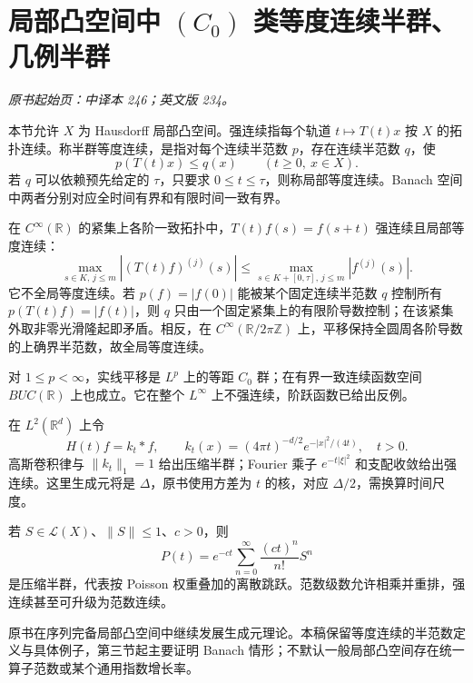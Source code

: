 \section{局部凸空间中 \texorpdfstring{$(C_0)$}{(C0)} 类等度连续半群、几例半群}\label{sec:yosida-09-02}
\noindent\textit{原书起始页：中译本 246；英文版 234。}

本节允许 $X$ 为 Hausdorff 局部凸空间。强连续指每个轨道 $t\mapsto T(t)x$ 按 $X$ 的拓扑连续。称半群等度连续，是指对每个连续半范数 $p$，存在连续半范数 $q$，使
\begin{equation}\label{eq:y9-equicontinuity}
 p(T(t)x)\le q(x)\qquad(t\ge0,\ x\in X).
\end{equation}
若 $q$ 可以依赖预先给定的 $\tau$，只要求 $0\le t\le\tau$，则称局部等度连续。Banach 空间中两者分别对应全时间有界和有限时间一致有界。

\begin{example}[局部与全局等度连续]
在 $C^\infty(\mathbb R)$ 的紧集上各阶一致拓扑中，$T(t)f(s)=f(s+t)$ 强连续且局部等度连续：
\[
 \max_{s\in K,\,j\le m}|(T(t)f)^{(j)}(s)|
 \le\max_{s\in K+[0,\tau],\,j\le m}|f^{(j)}(s)|.
\]
它不全局等度连续。若 $p(f)=|f(0)|$ 能被某个固定连续半范数 $q$ 控制所有 $p(T(t)f)=|f(t)|$，则 $q$ 只由一个固定紧集上的有限阶导数控制；在该紧集外取非零光滑隆起即矛盾。相反，在 $C^\infty(\mathbb R/2\pi\mathbb Z)$ 上，平移保持全圆周各阶导数的上确界半范数，故全局等度连续。
\end{example}

\begin{example}[平移、热流与跳跃]
对 $1\le p<\infty$，实线平移是 $L^p$ 上的等距 $C_0$ 群；在有界一致连续函数空间 $BUC(\mathbb R)$ 上也成立。它在整个 $L^\infty$ 上不强连续，阶跃函数已给出反例。

在 $L^2(\mathbb R^d)$ 上令
\begin{equation}\label{eq:y9-heat}
 H(t)f=k_t*f,\qquad k_t(x)=(4\pi t)^{-d/2}e^{-|x|^2/(4t)},\quad t>0.
\end{equation}
高斯卷积律与 $\|k_t\|_1=1$ 给出压缩半群；Fourier 乘子 $e^{-t|\xi|^2}$ 和支配收敛给出强连续。这里生成元将是 $\Delta$，原书使用方差为 $t$ 的核，对应 $\Delta/2$，需换算时间尺度。

若 $S\in\mathcal L(X)$、$\|S\|\le1$、$c>0$，则
\[
 P(t)=e^{-ct}\sum_{n=0}^\infty\frac{(ct)^n}{n!}S^n
\]
是压缩半群，代表按 Poisson 权重叠加的离散跳跃。范数级数允许相乘并重排，强连续甚至可升级为范数连续。
\end{example}

原书在序列完备局部凸空间中继续发展生成元理论。本稿保留等度连续的半范数定义与具体例子，第三节起主要证明 Banach 情形；不默认一般局部凸空间存在统一算子范数或某个通用指数增长率。

